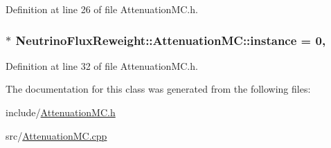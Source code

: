 Definition at line 26 of file Attenuation\-M\-C.\-h.

\hypertarget{class_neutrino_flux_reweight_1_1_attenuation_m_c_ab75129542683e731060a5911a27e93fc}{
\subsubsection[{instance}]{ $\ast$ Neutrino\-Flux\-Reweight\-::\-Attenuation\-M\-C\-::instance = 0\hspace{0.3cm}{\ttfamily [static]}, {\ttfamily [private]}}}\label{class_neutrino_flux_reweight_1_1_attenuation_m_c_ab75129542683e731060a5911a27e93fc}


Definition at line 32 of file Attenuation\-M\-C.\-h.



The documentation for this class was generated from the following files\-:\begin{DoxyCompactItemize}
\item 
include/\hyperlink{_attenuation_m_c_8h}{Attenuation\-M\-C.\-h}\item 
src/\hyperlink{_attenuation_m_c_8cpp}{Attenuation\-M\-C.\-cpp}\end{DoxyCompactItemize}
